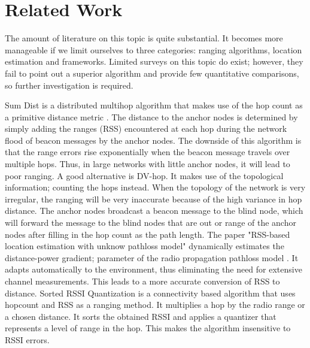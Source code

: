 \section{Related Work}
The amount of literature on this topic is quite substantial. It becomes more manageable if we limit ourselves to three categories: ranging algorithms, location estimation and frameworks. Limited surveys on this topic do exist; however, they fail to point out a superior algorithm and provide few quantitative comparisons, so further investigation is required. 

Sum Dist is a distributed multihop algorithm that makes use of the hop count as a primitive distance metric \cite{langendoen2003dlw}. The distance to the anchor nodes is determined by simply adding the ranges (RSS) encountered at each hop during the network flood of beacon messages by the anchor nodes. The downside of this algorithm is that the range errors rise exponentially when the beacon message travels over multiple hops. Thus, in large networks with little anchor nodes, it will lead to poor ranging. A good alternative is DV-hop. It makes use of the topological information; counting the hops instead. When the topology of the network is very irregular, the ranging will be very inaccurate because of the high variance in hop distance. The anchor nodes broadcast a beacon message to the blind node, which will forward the message to the blind nodes that are out or range of the anchor nodes after filling in the hop count as the path length.
The paper "RSS-based location estimation with unknow pathloss model" \cite{li2006rbl} dynamically estimates the distance-power gradient; parameter of the radio propagation pathloss model \cite{seidel1992mpl}. It adapts automatically to the environment, thus eliminating the need for extensive channel measurements. This  leads to a more accurate conversion of RSS to distance.
Sorted RSSI Quantization \cite{li2005srq} is a connectivity based algorithm that uses hopcount and RSS as a ranging method. It multiplies a hop by the radio range or a chosen distance. It sorts the obtained RSSI and applies a quantizer that represents a level of range in the hop. This makes the algorithm insensitive to RSSI errors.

